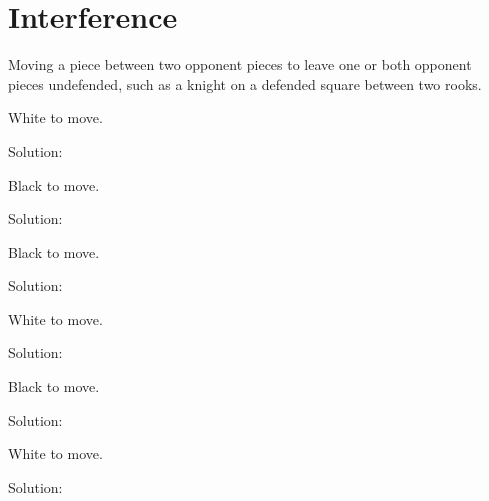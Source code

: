 \documentclass{book}
\begin{document}
\section{Interference}
Moving a piece between two opponent pieces to leave one or both opponent pieces undefended, such as a knight on a defended square between two rooks.\begin{multicols}{2} 
\begin{samepage} 
\newgame 


 
\showboard
 
 White to move. 
 
Solution: 
 
\end{samepage}\begin{samepage} 
\newgame 


 
\showboard
 
 Black to move. 
 
Solution: 
 
\end{samepage}\begin{samepage} 
\newgame 


 
\showboard
 
 Black to move. 
 
Solution: 
 
\end{samepage}\begin{samepage} 
\newgame 


 
\showboard
 
 White to move. 
 
Solution: 
 
\end{samepage}\begin{samepage} 
\newgame 


 
\showboard
 
 Black to move. 
 
Solution: 
 
\end{samepage}\begin{samepage} 
\newgame 


 
\showboard
 
 White to move. 
 
Solution: 
 
\end{samepage}\end{multicols} 
\newpage 
\end{document}
